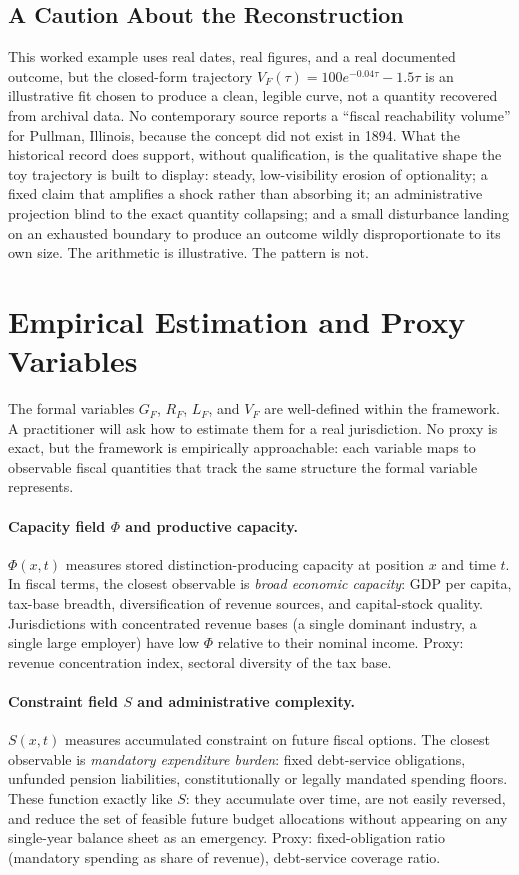 \documentclass[12pt,twoside,openright]{book}
\begin{document}
\subsection{A Caution About the Reconstruction}

This worked example uses real dates, real figures, and a real
documented outcome, but the closed-form trajectory
$V_F(\tau) = 100e^{-0.04\tau} - 1.5\tau$ is an illustrative
fit chosen to produce a clean, legible curve, not a quantity
recovered from archival data. No contemporary source reports a
``fiscal reachability volume'' for Pullman, Illinois, because the
concept did not exist in 1894. What the historical record does
support, without qualification, is the qualitative shape the toy
trajectory is built to display: steady, low-visibility erosion
of optionality; a fixed claim that amplifies a shock rather than
absorbing it; an administrative projection blind to the exact
quantity collapsing; and a small disturbance landing on an
exhausted boundary to produce an outcome wildly disproportionate
to its own size. The arithmetic is illustrative. The pattern is
not.

\section{Empirical Estimation and Proxy Variables}
\label{sec:ch27-proxies}

The formal variables $G_F$, $R_F$, $L_F$, and $V_F$ are
well-defined within the framework. A practitioner will ask
how to estimate them for a real jurisdiction. No proxy is
exact, but the framework is empirically approachable: each
variable maps to observable fiscal quantities that track
the same structure the formal variable represents.

\paragraph{Capacity field $\Phi$ and productive capacity.}
$\Phi(x,t)$ measures stored distinction-producing capacity
at position $x$ and time $t$. In fiscal terms, the closest
observable is \emph{broad economic capacity}: GDP per capita,
tax-base breadth, diversification of revenue sources, and
capital-stock quality. Jurisdictions with concentrated
revenue bases (a single dominant industry, a single large
employer) have low $\Phi$ relative to their nominal income.
Proxy: revenue concentration index, sectoral diversity of
the tax base.

\paragraph{Constraint field $S$ and administrative complexity.}
$S(x,t)$ measures accumulated constraint on future fiscal
options. The closest observable is \emph{mandatory
expenditure burden}: fixed debt-service obligations, unfunded
pension liabilities, constitutionally or legally mandated
spending floors. These function exactly like $S$: they
accumulate over time, are not easily reversed, and reduce
the set of feasible future budget allocations without
appearing on any single-year balance sheet as an emergency.
Proxy: fixed-obligation ratio (mandatory spending as share
of revenue), debt-service coverage ratio.
\end{document}

